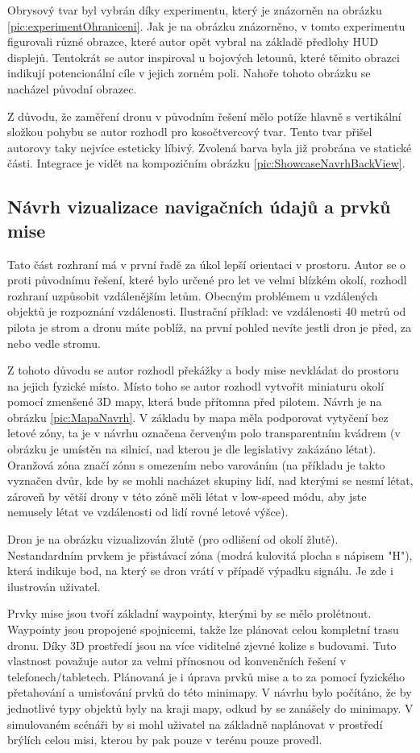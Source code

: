 Obrysový tvar byl vybrán díky experimentu, který je znázorněn na obrázku \ref{pic:experimentOhraniceni}. Jak je na obrázku znázorněno, v tomto experimentu figurovali různé obrazce, které autor opět vybral na základě předlohy HUD displejů.  Tentokrát se autor inspiroval u bojových letounů, které těmito obrazci indikují potencionální cíle v jejich zorném poli.  Nahoře tohoto obrázku se nacházel původní obrazec. 

Z důvodu, že zaměření dronu v původním řešení mělo potíže hlavně s vertikální složkou pohybu se autor rozhodl pro kosočtvercový tvar. Tento tvar přišel autorovy taky nejvíce esteticky líbivý. Zvolená barva byla již probrána ve statické části.  Integrace je vidět na kompozičním obrázku \ref{pic:ShowcaseNavrhBackView}.


\subsection{Návrh vizualizace navigačních údajů a prvků mise}
Tato část rozhraní má v první řadě za úkol lepší orientaci v prostoru. Autor se o proti původnímu řešení, které bylo určené pro let ve velmi blízkém okolí, rozhodl rozhraní uzpůsobit vzdálenějším letům. Obecným problémem u vzdálených objektů je rozpoznání vzdálenosti. Ilustrační příklad: ve vzdálenosti 40 metrů od pilota je strom a dronu máte poblíž, na první pohled nevíte jestli dron je před, za nebo vedle stromu. 

Z tohoto důvodu se autor rozhodl překážky a body mise nevkládat do prostoru na jejich fyzické místo. Místo toho se autor rozhodl vytvořit miniaturu okolí pomocí zmenšené 3D mapy, která bude přítomna před pilotem. Návrh je na obrázku  \ref{pic:MapaNavrh}. V základu by mapa měla podporovat vytyčení bez letové zóny, ta je v návrhu označena červeným polo transparentním kvádrem (v obrázku je umístěn na silnicí, nad kterou je dle legislativy zakázáno létat). Oranžová zóna značí zónu s omezením nebo varováním (na příkladu je takto vyznačen dvůr, kde by se mohli nacházet skupiny lidí, nad kterými se nesmí létat, zároveň by větší drony v této zóně měli létat v low-speed módu, aby jste nemusely létat ve vzdálenosti od lidí rovné letové výšce).

Dron je na obrázku vizualizován žlutě (pro odlišení od okolí žlutě). Nestandardním prvkem je přistávací zóna (modrá kulovitá plocha s nápisem "H"), která indikuje bod, na který se dron vrátí v případě výpadku signálu. Je zde i ilustrován uživatel.

Prvky mise jsou tvoří základní waypointy, kterými by se mělo prolétnout. Waypointy jsou propojené spojnicemi, takže lze plánovat celou kompletní trasu dronu. Díky 3D prostředí jsou na více viditelné zjevné kolize s budovami. Tuto vlastnost považuje autor za velmi přínosnou od konvenčních řešení v telefonech/tabletech. Plánovaná je i úprava prvků mise a to za pomocí fyzického přetahování a umisťování prvků do této minimapy. V návrhu bylo počítáno, že by jednotlivé typy objektů byly na kraji mapy, odkud by se zanášely do minimapy. V simulovaném scénáři by si mohl uživatel na základně naplánovat v prostředí brýlích celou misi, kterou by pak pouze v terénu pouze provedl.

